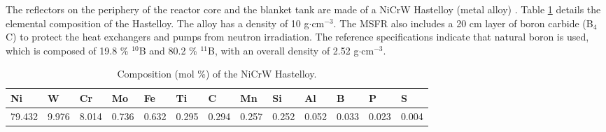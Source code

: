 The reflectors on the periphery of the reactor core and the blanket tank are
made of a NiCrW Hastelloy (metal alloy) \cite{brovchenko_neutronic_2019}.
Table \ref{table:refl} details the elemental composition
of the Hastelloy. The alloy has a density
of 10 g$\cdot$cm$^{-3}$. The \gls{MSFR} also includes a 20 cm
layer of boron carbide (B$_4$C) to protect the heat exchangers and pumps from
neutron irradiation. The reference specifications indicate that natural boron
is used, which is composed of 19.8 \% $^{10}$B and 80.2 \% $^{11}$B, with an
overall density of 2.52 g$\cdot$cm$^{-3}$. 
%
\begin{table}[htb!]
\footnotesize
\centering
\caption{Composition (mol \%) of the NiCrW Hastelloy.}
\begin{tabular}{l l l l l l l l l l l l l}
\toprule
Ni & W & Cr & Mo & Fe & Ti & C & Mn & Si & Al & B & P & S \\
\midrule
79.432 & 9.976 & 8.014 & 0.736 & 0.632 & 0.295 & 0.294 & 0.257 & 0.252 & 0.052 & 0.033 & 0.023 & 0.004 \\
\bottomrule
\end{tabular}
\label{table:refl}
\end{table}

